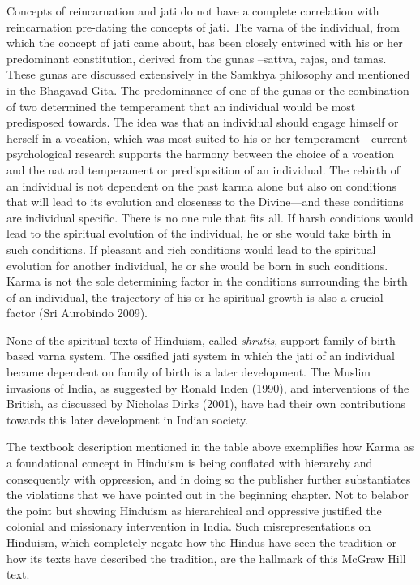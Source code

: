 Concepts of reincarnation and jati do not have a complete correlation with reincarnation pre-dating the concepts of jati. The varna of the individual, from which the concept of jati came about, has been closely entwined with his or her predominant constitution, derived from the gunas –sattva, rajas, and tamas. These gunas are discussed extensively in the Samkhya philosophy and mentioned in the Bhagavad Gita. The predominance of one of the gunas or the combination of two determined the temperament that an individual would be most predisposed towards. The idea was that an individual should engage himself or herself in a vocation, which was most suited to his or her temperament—current psychological research supports the harmony between the choice of a vocation and the natural temperament or predisposition of an individual. The rebirth of an individual is not dependent on the past karma alone but also on conditions that will lead to its evolution and closeness to the Divine—and these conditions are individual specific. There is no one rule that fits all. If harsh conditions would lead to the spiritual evolution of the individual, he or she would take birth in such conditions. If pleasant and rich conditions would lead to the spiritual evolution for another individual, he or she would be born in such conditions. Karma is not the sole determining factor in the conditions surrounding the birth of an individual, the trajectory of his or he spiritual growth is also a crucial factor (Sri Aurobindo 2009). 

None of the spiritual texts of Hinduism, called \textit{shrutis},  support family-of-birth based varna system. The ossified jati system in which the jati of an individual became dependent on family of birth is a later development. The Muslim invasions of India, as suggested by Ronald Inden (1990), and interventions of the British, as discussed by Nicholas Dirks (2001), have had their own contributions towards this later development in Indian society. 

The textbook description mentioned in the table above exemplifies how Karma as a foundational concept in Hinduism is being conflated with hierarchy and consequently with oppression, and in doing so the publisher further substantiates the violations that we have pointed out in the beginning chapter. Not to belabor the point but showing Hinduism as hierarchical and oppressive justified the colonial and missionary intervention in India. Such misrepresentations on Hinduism, which completely negate how the Hindus have seen the tradition or how its texts have described the tradition, are the hallmark of this McGraw Hill text.

